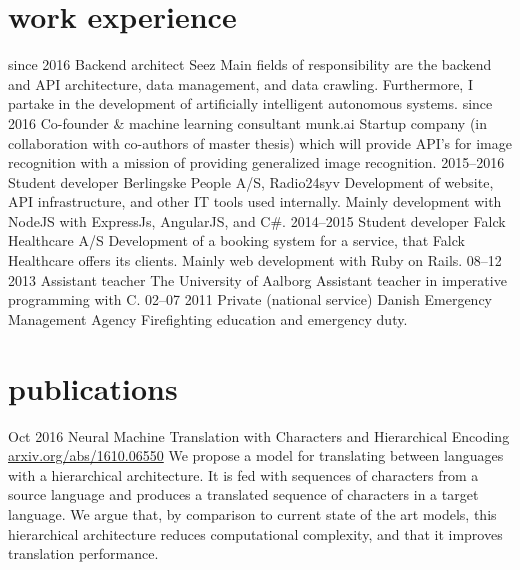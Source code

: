 \documentclass[print]{friggeri-cv}
\begin{document}
\section{work experience}

\begin{entrylist}
  \entry
    {since 2016}
    {Backend architect}
    {Seez}
    {Main fields of responsibility are the backend and API architecture, data management, and data crawling. 
	Furthermore, I partake in the development of artificially intelligent autonomous systems.}
  \entry
    {since 2016}
    {Co-founder \& machine learning consultant}
    {munk.ai}
    {Startup company (in collaboration with co-authors of master thesis) which will provide API's for image recognition with a mission of providing generalized image recognition.}
  \entry
    {2015--2016}
    {Student developer}
    {Berlingske People A/S, Radio24syv}
    {Development of website, API infrastructure, and other IT tools used internally. Mainly development with NodeJS with ExpressJs, AngularJS, and C\#.}
  \entry
    {2014--2015}
    {Student developer}
    {Falck Healthcare A/S}
    {Development of a booking system for a service, that Falck Healthcare offers its clients. Mainly web development with Ruby on Rails.}
  \entry
    {08–12 2013}
    {Assistant teacher}
    {The University of Aalborg}
    {Assistant teacher in imperative programming with C.}
  \entry
    {02–07 2011}
    {Private (national service)}
    {Danish Emergency Management Agency}
    {Firefighting education and emergency duty.}
\end{entrylist}

\section{publications}

\begin{entrylist}
  \entry
    {Oct 2016}
    {Neural Machine Translation with Characters and Hierarchical Encoding\\}
    {\href{https://arxiv.org/abs/1610.06550}{arxiv.org/abs/1610.06550}}
    {We propose a model for translating between languages with a hierarchical architecture. It is fed with sequences of 
    characters from a source language and produces a translated sequence of characters in a target language.
    We argue that, by comparison to current state of the art models, this hierarchical architecture reduces computational 
    complexity, and that it improves translation performance.}
\end{entrylist}
\end{document}
